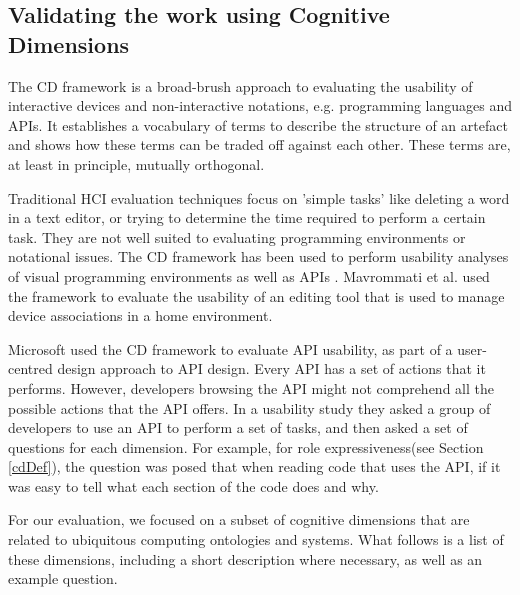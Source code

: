 \subsection{Validating the work using Cognitive Dimensions}
\label{CognitiveDimensions}

The \ac{CD} framework is a broad-brush approach to evaluating the usability of interactive devices and non-interactive notations, e.g. programming languages and \acp{API}. It establishes a vocabulary of terms to describe the structure of an artefact and shows how these terms can be traded off against each other. These terms are, at least in principle, mutually orthogonal.

Traditional HCI evaluation techniques focus on 'simple tasks' like deleting a word in a text editor, or trying to determine the time required to perform a certain task. They are not well suited to evaluating programming environments or notational issues. The \ac{CD} framework has been used to perform usability analyses of visual programming environments \cite{Green1996} as well as \acp{API} \cite{Clarke2004}. Mavrommati et al. \cite{Mavrommati2004} used the framework to evaluate the usability of an editing tool that is used to manage device associations in a home environment.

Microsoft \cite{Clarke2004} used the \ac{CD} framework to evaluate \ac{API} usability, as part of a user-centred design approach to \ac{API} design. Every \ac{API} has a set of actions that it performs. However, developers browsing the \ac{API} might not comprehend all the possible actions that the \ac{API} offers. In a usability study they asked a group of developers to use an API to perform a set of tasks, and then asked a set of questions for each dimension. For example, for role expressiveness(see Section \ref{cdDef}), the question was posed that when reading code that uses the \ac{API}, if it was easy to tell what each section of the code does and why.

For our evaluation, we focused on a subset of cognitive dimensions that are related to ubiquitous computing ontologies and systems. What follows is a list of these dimensions, including a short description where necessary, as well as an example question.


